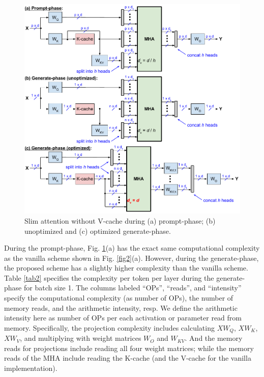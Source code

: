 \documentclass{article}
\begin{document}
\begin{figure}[h!] \centering
  \includegraphics[scale=0.88]{../doc/fig/slimAttn_fig3.pdf}
  \caption{Slim attention without V-cache during (a) prompt-phase; (b) unoptimized and (c) optimized generate-phase.}
\label{fig3} \end{figure}

During the prompt-phase, Fig. \ref{fig3}(a) has the exact same computational complexity as the vanilla scheme shown in Fig. \ref{fig2}(a). However, during the generate-phase, the proposed scheme has a slightly higher complexity than the vanilla scheme. Table \ref{tab2} specifies the complexity per token per layer during the generate-phase for batch size 1. The columns labeled ``OPs'', ``reads'', and ``intensity'' specify the computational complexity (as number of OPs), the number of memory reads, and the arithmetic intensity, resp. We define the arithmetic intensity here as number of OPs per each activation or parameter read from memory. Specifically, the projection complexity includes calculating $X W_Q$, $X W_K$, $X W_V$, and multiplying with weight matrices $W_O$ and $W_{KV}$. And the memory reads for projections include reading all four weight matrices; while the memory reads of the MHA include reading the K-cache (and the V-cache for the vanilla implementation).
\end{document}
